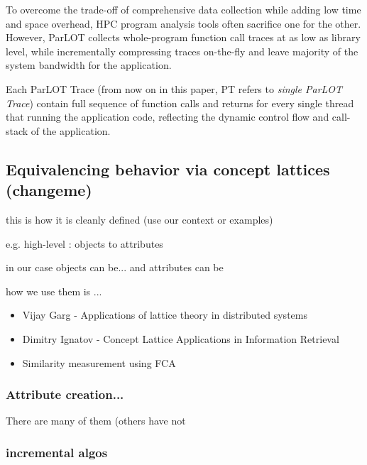 To overcome the trade-off of comprehensive data collection while adding low time and space overhead, HPC program analysis tools often sacrifice one for the other. However, ParLOT collects whole-program function call traces at as low as library level, while incrementally compressing traces on-the-fly and leave majority of the system bandwidth for the application. 

Each ParLOT Trace (from now on in this paper, PT refers to \textit{single ParLOT Trace}) contain full sequence of function calls and returns for every single thread that running the application code, reflecting the dynamic control flow and call-stack of the application.

\subsection{Equivalencing behavior via concept lattices (changeme)}

this is how it is cleanly defined (use our context or examples)

e.g. high-level : objects to attributes

in our case objects can be... and attributes can be

how we use them is ...


\begin{itemize}
\item Vijay Garg - Applications of lattice theory in distributed systems

\item Dimitry Ignatov \cite{ignatov} - Concept Lattice Applications in Information Retrieval

\item \cite{clbook} \cite{clconst} \cite{bender05} \citep{latticeForDistConst} 

Similarity measurement using FCA \cite{Alqadah2011}
\end{itemize}



\subsubsection{Attribute creation...}

There are many of them (others have not 

\subsubsection{incremental algos}

